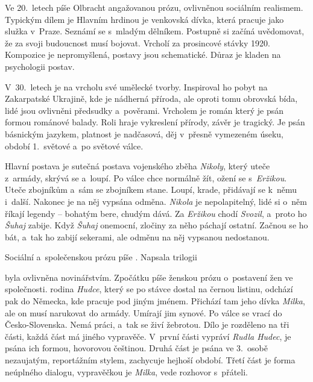 Ve 20.~letech píše Olbracht angažovanou prózu, ovlivněnou sociálním
realismem. Typickým dílem je  Hlavním hrdinou je
venkovská dívka, která pracuje jako služka v~Praze. Seznámí se s~mladým
dělníkem. Postupně si začíná uvědomovat, že za svoji budoucnost musí
bojovat. Vrcholí za prosincové stávky 1920. Kompozice je nepromyšlená,
postavy jsou schematické. Důraz je kladen na psychologii postav.

V~30.~letech je na vrcholu své umělecké tvorby. Inspiroval ho pobyt na
Zakarpatské Ukrajině, kde je nádherná příroda, ale oproti tomu obrovská
bída, lidé jsou ovlivněni předsudky a~pověrami. Vrcholem je román
 který je psán formou románové balady.
Roli hraje vykreslení přírody, závěr je tragický. Je psán básnickým
jazykem, platnost je nadčasová, děj v~přesně vymezeném úseku, období
1.~světové a~po světové válce.

Hlavní postava je sutečná postava vojenského zběha \emph{Nikoly}, který
uteče z~armády, skrývá se a~loupí. Po válce chce normálně žít, ožení se
s~\emph{Eržikou}. Uteče zbojníkům a~sám se zbojníkem stane. Loupí,
krade, přidávají se k~němu i~další. Nakonec je na něj vypsána odměna.
\emph{Nikola} je nepolapitelný, lidé si o~něm říkají legendy -- bohatým
bere, chudým dává. Za \emph{Eržikou} chodí \emph{Svozil}, a~proto ho
\emph{Šuhaj} zabije. Když \emph{Šuhaj} onemocní, zločiny za něho páchají
ostatní. Začnou se ho bát, a~tak ho zabijí sekerami, ale odměnu na něj
vypsanou nedostanou.

\delic

Sociální a~společenskou prózu píše . Napsala trilogii
  

\delic

 byla ovlivněna novinářstvím. Zpočátku píše
ženskou prózu o~postavení žen ve společnosti. 
rodina \emph{Hudce}, který se po stávce dostal na černou listinu, odchází pak
do Německa, kde pracuje pod jiným jménem. Přichází tam jeho dívka
\emph{Milka}, ale on musí narukovat do armády. Umírají jim synové. Po
válce se vrací do Česko-Slovenska. Nemá práci, a~tak se živí žebrotou.
Dílo je rozděleno na tři části, každá část má jiného vypravěče. V~první
části vypráví \emph{Rudla Hudec}, je psána ich formou, hovorovou
češtinou. Druhá část je psána ve 3.~osobě nezaujatým, reportážním
stylem, zachycuje hejhoší období. Třetí část je forma neúplného dialogu,
vypravěčkou je \emph{Milka}, vede rozhovor s~přáteli.


